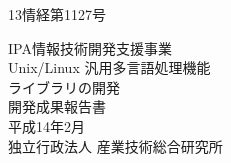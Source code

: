 \documentclass[a4paper,12pt,twoside]{article}	%
\begin{document}
\begin{titlepage}
\begin{flushright}
{\Large 13情経第1127号}
\end{flushright}
\vspace*{2cm}
\begin{center}
{\Huge IPA情報技術開発支援事業}\\
\vspace*{2cm}
{\Huge Unix/Linux 汎用多言語処理機能\\ライブラリの開発}\\
\vspace*{2cm}
{\Huge 開発成果報告書}\\
\vspace*{7cm}
{\Huge 平成14年2月}\\
\vspace*{1.5cm}
{\Huge 独立行政法人 産業技術総合研究所}
\end{center}
\end{titlepage}
\cleardoublepage
{}
\tableofcontents
\newpage
{}

\newpage
\sectionOnNewpage
\end{document}

